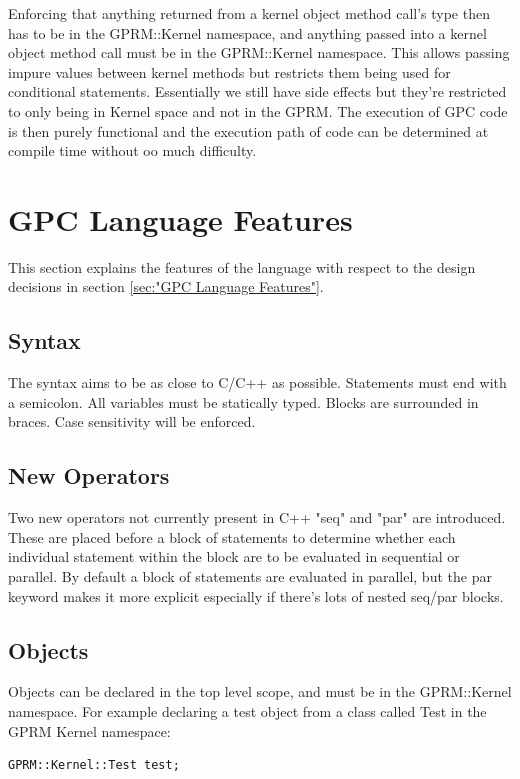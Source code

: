 Enforcing that anything returned from a kernel object method call's type then has to be in the 
GPRM::Kernel namespace, and anything passed into a kernel object method call must be in the GPRM::Kernel
namespace. This allows passing impure values between kernel methods but restricts them being used
for conditional statements. Essentially we still have side effects but they're restricted to
only being in Kernel space and not in the GPRM. The execution of GPC code is then purely functional
and the execution path of code can be determined at compile time without oo much difficulty.

\section{GPC Language Features}

    This section explains the features of the language with respect to the design decisions in section \ref{sec:"GPC Language Features"}.

\subsection{Syntax}
        The syntax aims to be as close to C/C++ as possible. Statements must end with a semicolon. 
        All variables must be statically typed. Blocks are surrounded in braces. Case sensitivity
        will be enforced.

\subsection{New Operators}
        Two new operators not currently present in C++ "seq" and "par" are introduced. 
        These are placed before a block
        of statements to determine whether each individual statement within the block are
        to be evaluated in sequential or parallel. By default a block of statements are evaluated
        in parallel, but the par keyword makes it more explicit especially if there's lots of nested
        seq/par blocks.

\subsection{Objects}
Objects can be declared in the top level scope, and must be in the GPRM::Kernel namespace.
For example declaring a test object from a class called Test in the GPRM Kernel namespace:

\begin{lstlisting}[style=myGPC]
GPRM::Kernel::Test test;
\end{lstlisting}


